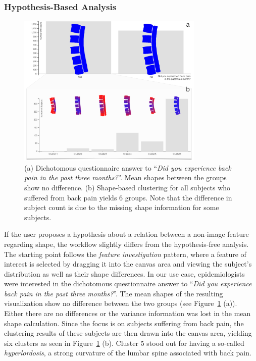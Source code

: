 \documentclass[journal]{style/vgtc} 			          %
\begin{document}
\subsubsection{Hypothesis-Based Analysis} \label{Hypothesis based Analysis}
\begin{figure}[htb]
 \centering
 \includegraphics[width=3.5in]{figures/hypothesisbased}
 \caption{(a) Dichotomous questionnaire answer to ``\emph{Did you experience back pain in the past three months?}''.
 Mean shapes between the groups show no difference.
 (b) Shape-based clustering for all subjects who suffered from back pain yields 6 groups. 
 Note that the difference in subject count is due to the missing shape information for some subjects.
 }
 \label{fig:hypopthesisbased}
\end{figure}
%
If the user proposes a hypothesis about a relation between a non-image feature regarding shape, the workflow slightly differs from the hypothesis-free analysis.
%
The starting point follows the \emph{feature investigation} pattern, where a feature of interest is selected by dragging it into the canvas area and viewing the subject's distribution as well as their shape differences.
%
In our use case, epidemiologists were interested in the dichotomous questionnaire answer to ``\emph{Did you experience back pain in the past three months?}''.
%
The mean shapes of the resulting visualization show no difference between the two groups (see Figure~\ref{fig:hypopthesisbased} (a)).
%
Either there are no differences or the variance information was lost in the mean shape calculation.
%
Since the focus is on subjects suffering from back pain, the clustering results of these subjects are then drawn into the canvas area, yielding six clusters as seen in Figure~\ref{fig:hypopthesisbased} (b).
%
Cluster 5 stood out for having a so-called \emph{hyperlordosis}, a strong curvature of the lumbar spine associated with back pain.
\end{document}
